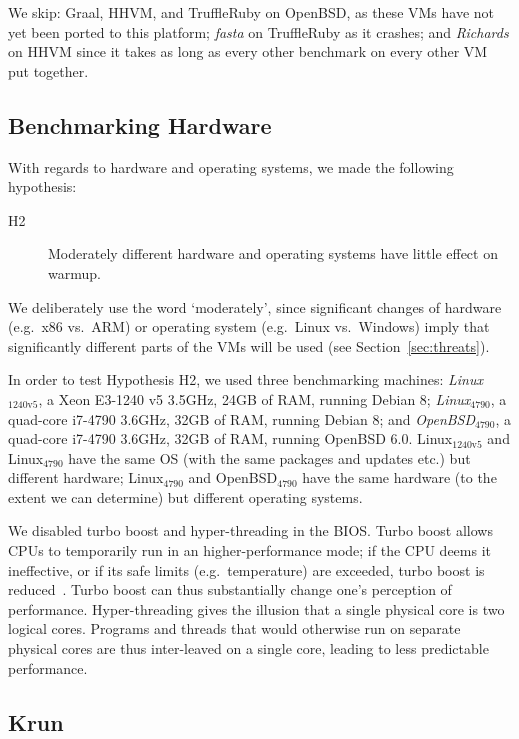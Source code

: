 \documentclass[acmsmall]{acmart}\settopmatter{printfolios=true}
\newcommand{\krun}{Krun\xspace}
\newcommand{\hyptwo}{H2\xspace}
\newcommand{\richards}{\emph{Richards}\xspace}
\newcommand{\fasta}{\emph{fasta}\xspace}
\newcommand{\bencherfive}{Linux$_\mathrm{4790}$\xspace}
\newcommand{\benchersix}{OpenBSD$_\mathrm{4790}$\xspace}
\newcommand{\bencherseven}{Linux$_\mathrm{1240v5}$\xspace}
\begin{document}
\label{openbsd porting} We skip: Graal, HHVM, and TruffleRuby on OpenBSD, as
these VMs have not yet been ported to this platform; \fasta on TruffleRuby as
it crashes; and \richards on HHVM since it takes as long as every other benchmark
on every other VM put together.


\subsection{Benchmarking Hardware}

With regards to hardware and operating systems, we made the
following hypothesis:
\begin{description}
  \item[\hyptwo] Moderately different hardware and operating systems have little effect on warmup.
\end{description}
We deliberately use the word `moderately', since significant changes of hardware
(e.g.~x86 vs.~ARM) or operating system (e.g.~Linux vs.~Windows) imply that
significantly different parts of the VMs will be used (see Section~\ref{sec:threats}).

In order to test Hypothesis \hyptwo, we used three benchmarking machines: \emph{\bencherseven}, a Xeon E3-1240 v5 3.5GHz,
24GB of RAM, running Debian 8; \emph{\bencherfive}, a quad-core i7-4790
3.6GHz, 32GB of RAM, running Debian 8; and \emph{\benchersix}, a quad-core i7-4790
3.6GHz, 32GB of RAM, running OpenBSD 6.0. \bencherseven and \bencherfive
have the same OS (with the same packages and updates etc.) but different hardware; \bencherfive
and \benchersix have the same hardware (to the extent we can determine)
but different operating systems.

We disabled turbo boost and hyper-threading in the BIOS. Turbo boost
allows CPUs to temporarily run in an higher-performance
mode; if the CPU deems it ineffective, or if its safe limits (e.g.~temperature) are exceeded,
turbo boost is reduced~\cite{charles09turboboost}. Turbo boost
can thus substantially change one's
perception of performance. Hyper-threading gives the illusion that a single
physical core is two logical cores. Programs and threads that would
otherwise run on separate physical cores are thus inter-leaved on
a single core, leading to less predictable performance.


\subsection{\krun}
\label{krun}
\end{document}
